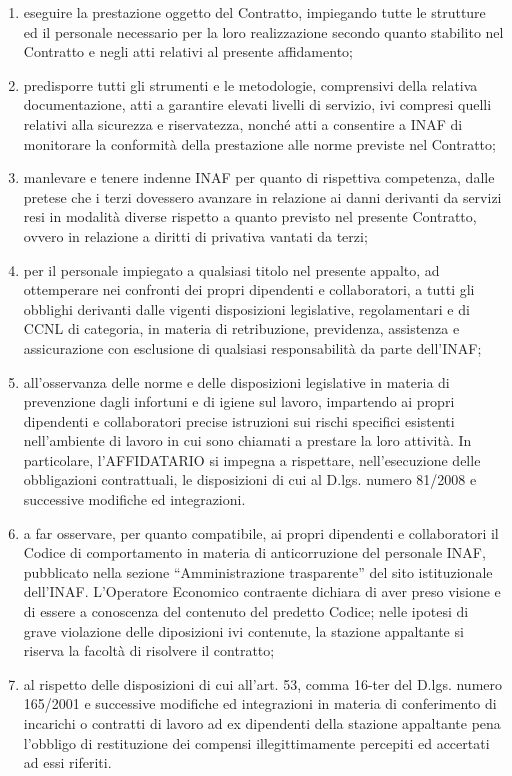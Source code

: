 \begin{enumerate}
	\item eseguire la prestazione oggetto del Contratto, impiegando tutte le
strutture ed il personale necessario per la loro realizzazione secondo
quanto stabilito nel Contratto e negli atti relativi al presente
affidamento;

\item predisporre tutti gli strumenti e le metodologie, comprensivi della
relativa documentazione, atti a garantire elevati livelli di servizio,
ivi compresi quelli relativi alla sicurezza e riservatezza, nonché atti
a consentire a INAF di monitorare la conformità della prestazione alle
norme previste nel Contratto;

\item manlevare e tenere indenne INAF per quanto di rispettiva competenza, dalle
pretese che i terzi dovessero avanzare in relazione ai danni derivanti da
servizi resi in modalità diverse rispetto a quanto previsto nel presente
Contratto, ovvero in relazione a diritti di privativa vantati da terzi;

\item per il personale impiegato a qualsiasi titolo nel presente appalto,
ad ottemperare nei confronti dei propri dipendenti e collaboratori,
a tutti gli obblighi derivanti dalle vigenti disposizioni legislative,
regolamentari e di CCNL di categoria, in materia di retribuzione,
previdenza, assistenza e assicurazione con esclusione di qualsiasi
responsabilità da parte dell'INAF;

\item all'osservanza delle norme e delle disposizioni legislative in materia
di prevenzione dagli infortuni e di igiene sul lavoro, impartendo ai
propri dipendenti e collaboratori precise istruzioni sui rischi specifici
esistenti nell'ambiente di lavoro in cui sono chiamati a prestare la
loro attività. In particolare, l'AFFIDATARIO si impegna a rispettare,
nell'esecuzione delle obbligazioni contrattuali, le disposizioni di cui
al D.lgs. numero 81/2008 e successive modifiche ed integrazioni. 

\item a far osservare, per quanto compatibile, ai propri dipendenti e
collaboratori il Codice di comportamento in materia di anticorruzione del
personale INAF, pubblicato nella sezione “Amministrazione trasparente”
del sito istituzionale dell'INAF. L'Operatore Economico contraente
dichiara di aver preso visione e di essere a conoscenza del contenuto
del predetto Codice; nelle ipotesi di grave violazione delle diposizioni
ivi contenute, la stazione appaltante si riserva la facoltà di risolvere
il contratto;

\item al rispetto delle disposizioni di cui all'art. 53, comma 16-ter del
D.lgs. numero 165/2001 e successive modifiche ed integrazioni in materia
di conferimento di incarichi o contratti di lavoro ad ex dipendenti
della stazione appaltante pena l'obbligo di restituzione dei compensi
illegittimamente percepiti ed accertati ad essi riferiti.
\end{enumerate}

